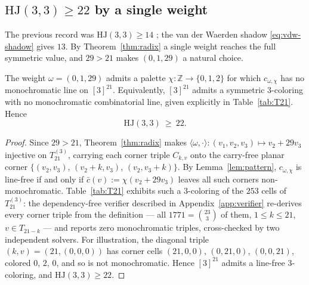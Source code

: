 \documentclass[12pt]{article}
\newcommand{\HJ}{\mathrm{HJ}}
\newcommand{\Z}{\mathbb{Z}}
\begin{document}
\subsection{\texorpdfstring{$\HJ(3,3)\ge 22$ by a single weight}{HJ(3,3) >= 22 by a single weight}}\label{sec:hj33}

The previous record was $\HJ(3,3)\ge 14$ \cite{ConlonFarnsworthRobertson2026}; the van der
Waerden shadow \eqref{eq:vdw-shadow} gives $13$. By
Theorem~\ref{thm:radix} a single weight reaches the full symmetric
value, and $29>21$ makes $(0,1,29)$ a natural choice.

\begin{theorem}\label{thm:hj33-22}
The weight $\omega=(0,1,29)$ admits a palette
$\chi\colon\Z\to\{0,1,2\}$ for which $c_{\omega,\chi}$ has no
monochromatic line on $[3]^{21}$. Equivalently,
$[3]^{21}$ admits a symmetric $3$-coloring with no monochromatic
combinatorial line, given explicitly in Table~\ref{tab:T21}. Hence
\[
\HJ(3,3)\ \ge\ 22 .
\]
\end{theorem}

\begin{proof}
Since $29>21$, Theorem~\ref{thm:radix} makes
$\langle\omega,\cdot\rangle\colon(v_{1},v_{2},v_{3})\mapsto v_{2}+29v_{3}$
injective on $T_{21}^{(3)}$, carrying each corner triple $C_{k,v}$ onto
the carry-free planar corner $\{(v_{2},v_{3})$, $(v_{2}{+}k,v_{3})$,
$(v_{2},v_{3}{+}k)\}$. By
Lemma~\ref{lem:pattern}, $c_{\omega,\chi}$ is line-free if and only if
$\bar c(v):=\chi(v_{2}+29v_{3})$ leaves all such corners
non-monochromatic. Table~\ref{tab:T21} exhibits such a $3$-coloring of
the $253$ cells of $T_{21}^{(3)}$: the dependency-free verifier
described in Appendix~\ref{app:verifier} re-derives every corner triple
from the definition --- all $1771=\binom{23}{3}$ of them,
$1\le k\le 21$, $v\in T_{21-k}$ --- and reports zero monochromatic
triples, cross-checked by two independent solvers. For illustration, the
diagonal triple $(k,v)=(21,(0,0,0))$ has corner cells
$(21,0,0)$, $(0,21,0)$, $(0,0,21)$, colored $0$, $2$, $0$, and so is
not monochromatic. Hence $[3]^{21}$ admits a line-free $3$-coloring, and
$\HJ(3,3)\ge 22$.
\end{proof}
\end{document}
